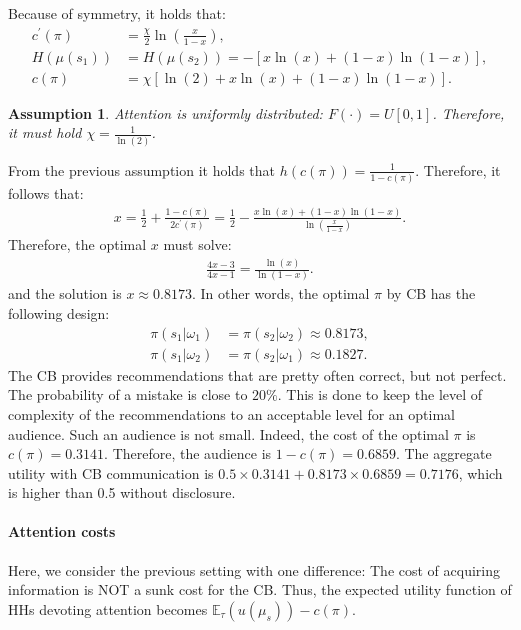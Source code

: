 \documentclass[12pt,a4paper]{article}
\newtheorem{assumption}{Assumption}
\begin{document}
Because of symmetry, it holds that:
\begin{align} 
    \label{cprime}
    c^\prime(\pi) & = \frac{\chi}{2}\ln\left(\frac{x}{1-x}\right), \\
    H(\mu(s_1)) & = H(\mu(s_2))=-[x\ln(x)+(1-x)\ln(1-x)], \\
    \label{c}
    c(\pi) & = \chi[\ln(2)+x\ln(x)+(1-x)\ln(1-x)].
\end{align}
\begin{assumption}
\label{Ass2}
    Attention is uniformly distributed: $F(\cdot)=U[0,1]$. Therefore, it must hold $\chi=\frac{1}{\ln(2)}$. 
\end{assumption}
From the previous assumption it holds that $h(c(\pi))=\frac{1}{1-c(\pi)}$. Therefore, it follows that:
\begin{align}
    x=\frac{1}{2}+\frac{1-c(\pi)}{2c^\prime(\pi)}=\frac{1}{2}-\frac{x\ln(x)+(1-x)\ln(1-x)}{\ln\left(\frac{x}{1-x}\right)}.
\end{align}
Therefore, the optimal $x$ must solve:
\begin{align}
    \frac{4x-3}{4x-1}=\frac{\ln(x)}{\ln(1-x)}.
\end{align}
and the solution is $x\approx 0.8173$. In other words, the optimal $\pi$ by CB has the following design:
\begin{align}
    \pi(s_1|\omega_1) & = \pi(s_2|\omega_2)\approx 0.8173, \\
    \pi(s_1|\omega_2) & = \pi(s_2|\omega_1)\approx 0.1827.
\end{align}
The CB provides recommendations that are pretty often correct, but not perfect. The probability of a mistake is close to $20\%$. This is done to keep the level of complexity of the recommendations to an acceptable level for an optimal audience. Such an audience is not small. Indeed, the cost of the optimal $\pi$ is $c(\pi)=0.3141$. Therefore, the audience is $1-c(\pi)=0.6859$. The aggregate utility with CB communication is $0.5 \times 0.3141 + 0.8173 \times  0.6859 = 0.7176$, which is higher than 0.5 without disclosure.

\paragraph{Attention costs}
Here, we consider the previous setting with one difference: The cost of acquiring information is NOT a sunk cost for the CB. Thus, the expected utility function of HHs devoting attention becomes $\mathbb{E}_{\tau}(u(\mu_s))-c(\pi)$. 
\end{document}
